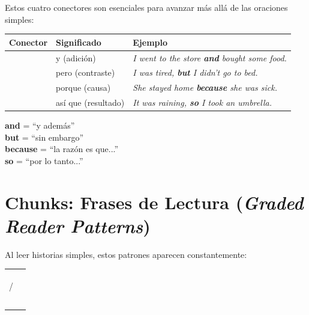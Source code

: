 \documentclass[12pt,a4paper]{article}
\begin{document}
\begin{cajachunk}
Estos cuatro conectores son esenciales para avanzar más allá de las oraciones simples:

\medskip
\begin{tabularx}{\textwidth}{@{} l l X @{}}
\toprule
\textbf{Conector} & \textbf{Significado} & \textbf{Ejemplo} \\
\midrule
\eng{and} & y (adición) & \textit{I went to the store \textbf{and} bought some food.} \\[4pt]
\eng{but} & pero (contraste) & \textit{I was tired, \textbf{but} I didn't go to bed.} \\[4pt]
\eng{because} & porque (causa) & \textit{She stayed home \textbf{because} she was sick.} \\[4pt]
\eng{so} & así que (resultado) & \textit{It was raining, \textbf{so} I took an umbrella.} \\
\bottomrule
\end{tabularx}

\medskip
\begin{cajaejemplo}
\textbf{and} = ``y además''\\
\textbf{but} = ``sin embargo''\\
\textbf{because} = ``la razón es que...''\\
\textbf{so} = ``por lo tanto...''
\end{cajaejemplo}
\end{cajachunk}

\section{Chunks: Frases de Lectura (\textit{Graded Reader Patterns})}

\begin{cajachunk}
Al leer historias simples, estos patrones aparecen constantemente:

\medskip
\begin{tabularx}{\textwidth}{@{} X l @{}}
\eng{Once upon a time...} & \esp{Érase una vez...} \\
\eng{One day, ...} & \esp{Un día, ...} \\
\eng{A long time ago, ...} & \esp{Hace mucho tiempo, ...} \\
\eng{Then, ...} / \eng{After that, ...} & \esp{Luego, ... / Después de eso, ...} \\
\eng{Suddenly, ...} & \esp{De repente, ...} \\
\eng{Finally, ...} & \esp{Finalmente, ...} \\
\eng{The next day, ...} & \esp{Al día siguiente, ...} \\
\eng{At the end, ...} & \esp{Al final, ...} \\
\eng{... and they lived happily ever after.} & \esp{... y vivieron felices para siempre.} \\
\end{tabularx}
\end{cajachunk}
\end{document}
